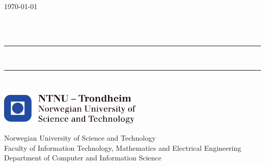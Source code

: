 \begin{titlepage}


{\large \today}

\begin{center}
    
     
    ~\\[3.5cm]
    
    \LARGE \textbf{\myauthor}\\[1.5cm]
    
    \hrule ~\\[0.2cm]
    {\fontsize{25pt}{40pt}\selectfont\mytitle}	%
    \vspace{0.5cm}
    \hrule ~\\[0.2cm]
    
    
    \vspace{1.5cm}
\end{center}




\vfill






\includegraphics[height=1.5cm]{images/ntnu_logo.pdf} 

\vspace{1.0cm} 

\large{Norwegian University of Science and Technology
\\[0.2cm]
Faculty of Information Technology, Mathematics and Electrical Engineering
\\[0.2cm]
Department of Computer and Information Science} 
\vspace{1.5cm} 

\end{titlepage}